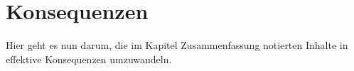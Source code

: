 
\chapter{Konsequenzen}
Hier geht es nun darum, die im Kapitel Zusammenfassung notierten Inhalte in effektive Konsequenzen umzuwandeln.
